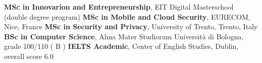 %
%
%


\begin{scholarship}
	{\textbf{MSc in Innovarion and Entrepreneurship}, EIT Digital Masterschool (double degree program)}
	{\textbf{MSc in Mobile and Cloud Security}, EURECOM, Nice, France }
	{\textbf{MSc in Security and Privacy}, University of Trento, Trento, Italy }
					{\textbf{BSc in Computer Science}, Alma Mater Studiorum Universit\`a di Bologna, grade 100/110 ( B ) }
					{\textbf{IELTS Academic}, Center of English Studies, Dublin, overall score 6.0}
\end{scholarship}
